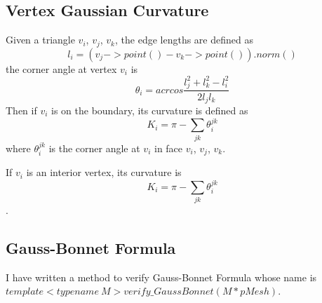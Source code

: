 \documentclass{article}
\begin{document}
\subsection{Vertex Gaussian Curvature}
Given a triangle $v_i$, $v_j$, $v_k$, the edge lengths are defined as $$l_i=(v_j->point() - v_k->point()).norm()$$ the corner angle at vertex $v_i$ is $$\theta_i=acrcos\frac{l^2_j+l^2_k-l^2_i}{2l_jl_k}$$ Then if $v_i$ is on the boundary, its curvature is defined as $$K_i=\pi-\sum_{jk}\theta^{jk}_i$$ where $\theta^{jk}_i$ is the corner angle at $v_i$ in face $v_i$, $v_j$, $v_k$.

If $v_i$ is an interior vertex, its curvature is $$K_i=\pi-\sum_{jk}\theta^{jk}_i$$.

\subsection{Gauss-Bonnet Formula}
I have written a method to verify Gauss-Bonnet Formula whose name is $template<typename\ M>verify\_GaussBonnet(M * pMesh)$.



\end{document}
